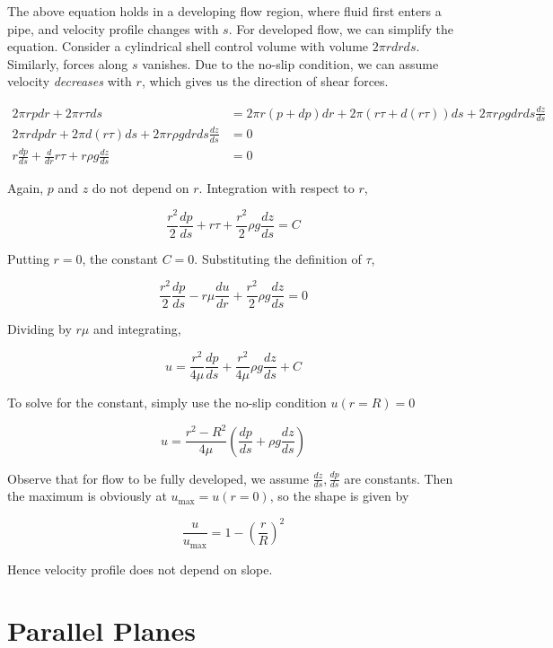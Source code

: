 \documentclass[12pt]{article}
\begin{document}
The above equation holds in a developing flow region, where fluid first enters a pipe, and velocity profile changes with $s$. For developed flow, we can simplify the equation. Consider a cylindrical shell control volume with volume $2\pi rdrds$. Similarly, forces along $s$ vanishes. Due to the no-slip condition, we can assume velocity \textit{decreases} with $r$, which gives us the direction of shear forces.

\begin{align*}
    2\pi rpdr + 2\pi r\tau ds &= 2\pi r(p + dp)dr + 2\pi (r\tau + d(r\tau)) ds + 2\pi r\rho g drds \frac{dz}{ds} \\
    2\pi rdpdr + 2\pi d(r\tau)ds + 2\pi r\rho g drds \frac{dz}{ds} &= 0 \\
    r \frac{dp}{ds} + \frac{d}{dr} r\tau + r\rho g \frac{dz}{ds} &= 0
\end{align*}

Again, $p$ and $z$ do not depend on $r$. Integration with respect to $r$,

$$\frac{r^2}{2} \frac{dp}{ds} + r\tau + \frac{r^2}{2} \rho g \frac{dz}{ds} = C$$

Putting $r=0$, the constant $C=0$. Substituting the definition of $\tau$,

$$\frac{r^2}{2} \frac{dp}{ds} - r\mu \frac{du}{dr} + \frac{r^2}{2} \rho g \frac{dz}{ds} = 0$$

Dividing by $r\mu$ and integrating,

$$u = \frac{r^2}{4\mu} \frac{dp}{ds} + \frac{r^2}{4\mu} \rho g \frac{dz}{ds} + C$$

To solve for the constant, simply use the no-slip condition $u(r=R) = 0$

\begin{equation}
    u = \frac{r^2-R^2}{4\mu} \left(\frac{dp}{ds} + \rho g \frac{dz}{ds}\right)
\end{equation}

Observe that for flow to be fully developed, we assume $\frac{dz}{ds}, \frac{dp}{ds}$ are constants. Then the maximum is obviously at $u_{\text{max}} = u(r=0)$, so the shape is given by

$$\frac{u}{u_{\text{max}}} = 1 - \left(\frac{r}{R}\right)^2$$

Hence velocity profile does not depend on slope.

\section{Parallel Planes}
\end{document}
